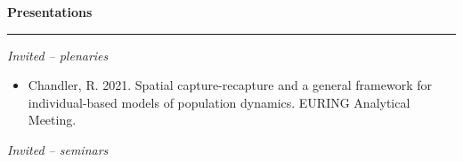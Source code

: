 \documentclass[12pt]{article}
\begin{document}
\vspace{0.5cm}


{\large \bf Presentations} \\
\rule[3mm]{\textwidth}{0.3mm}

\emph{Invited -- plenaries}

\begin{itemize}

\item Chandler, R. 2021. Spatial capture-recapture and a general
  framework for individual-based models of population dynamics.
  EURING Analytical Meeting. 

\end{itemize}  


\emph{Invited -- seminars}
\end{document}
